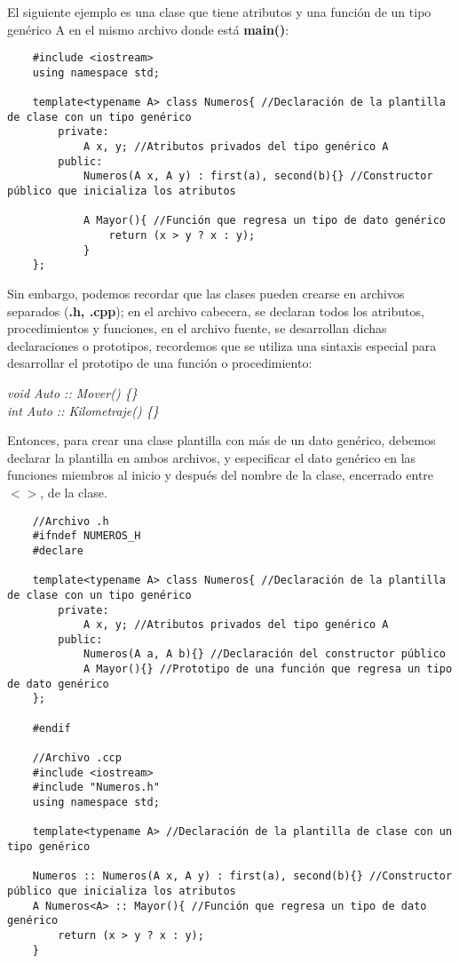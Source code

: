 El siguiente ejemplo es una clase que tiene atributos y una función de un tipo genérico A en el mismo archivo donde está \textbf{main()}:
\begin{lstlisting}
    #include <iostream>
    using namespace std;
    
    template<typename A> class Numeros{ //Declaración de la plantilla de clase con un tipo genérico
        private:
            A x, y; //Atributos privados del tipo genérico A
        public:
            Numeros(A x, A y) : first(a), second(b){} //Constructor público que inicializa los atributos
            
            A Mayor(){ //Función que regresa un tipo de dato genérico
                return (x > y ? x : y);
            }
    };
\end{lstlisting}

Sin embargo, podemos recordar que las clases pueden crearse en archivos separados (\textbf{.h, .cpp}); en el archivo cabecera, se declaran todos los atributos, procedimientos y funciones, en el archivo fuente, se desarrollan dichas declaraciones o prototipos, recordemos que se utiliza una sintaxis especial para desarrollar el prototipo de una función o procedimiento:
\begin{center}
    \textit{
        void Auto :: Mover() \{\} \\
        int Auto :: Kilometraje() \{\}
    }
\end{center}

Entonces, para crear una clase plantilla con más de un dato genérico, debemos declarar la plantilla en ambos archivos, y especificar el dato genérico en las funciones miembros al inicio y después del nombre de la clase, encerrado entre \textbf{$< >$}, de la clase. 
\begin{lstlisting}
    //Archivo .h
    #ifndef NUMEROS_H
    #declare
    
    template<typename A> class Numeros{ //Declaración de la plantilla de clase con un tipo genérico
        private:
            A x, y; //Atributos privados del tipo genérico A
        public:
            Numeros(A a, A b){} //Declaración del constructor público
            A Mayor(){} //Prototipo de una función que regresa un tipo de dato genérico
    };
    
    #endif
    
    //Archivo .ccp
    #include <iostream>
    #include "Numeros.h"
    using namespace std;
    
    template<typename A> //Declaración de la plantilla de clase con un tipo genérico
    
    Numeros :: Numeros(A x, A y) : first(a), second(b){} //Constructor público que inicializa los atributos
    A Numeros<A> :: Mayor(){ //Función que regresa un tipo de dato genérico
        return (x > y ? x : y);
    }
\end{lstlisting}

